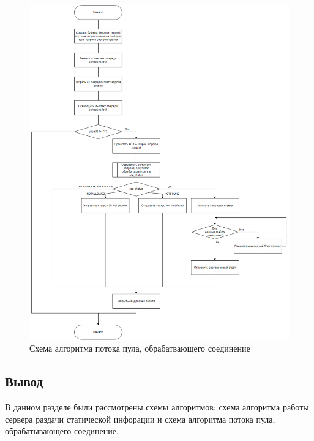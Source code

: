 \begin{figure}[h!]
	\centering
	\captionsetup{justification=centering}
	\includegraphics[width=160mm]{img/thread.png}
	\caption{Схема алгоритма потока пула, обрабатвающего соединение}
	\label{fig:thread}
\end{figure}

\clearpage

\subsection*{Вывод}

В данном разделе были рассмотрены схемы алгоритмов: схема алгоритма работы сервера раздачи статической инфорации и схема алгоритма потока пула, обрабатывающего соединение.


